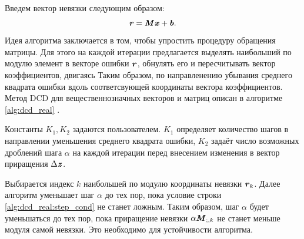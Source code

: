 Введем вектор невязки следующим образом:
\begin{equation}
	\textbf{\textit{r}}=\textbf{\textit{M}}\textbf{\textit{x}}+\textbf{\textit{b}}.
	\label{system_of_lin_eq_residual}
\end{equation}
Идея алгоритма заключается в том, чтобы упростить процедуру обращения матрицы. Для этого на каждой итерации предлагается выделять наибольший по модулю элемент в векторе ошибки $\textbf{\textit{r}}$, обнулять его и пересчитывать вектор коэффициентов, двигаясь Таким образом, по направленению убывания среднего квадрата ошибки вдоль соответсвующей координаты вектора коэффициентов. Метод DCD для вещественнозначных векторов и матриц описан в алгоритме \ref{alg:dcd_real} \cite{dcd_alg_thesis}.
\begin{algorithm}[!ht]
	\caption{Real-valued leading DCD algorithm}
	\label{alg:dcd_real}
\end{algorithm}

Константы $K_1, K_2$ задаются пользователем. $K_1$ определяет количество шагов в направлении уменьшения среднего квадрата ошибки, $K_2$ задаёт число возможных дроблений шага $\alpha$ на каждой итерации перед внесением изменения в вектор приращения $\Delta\textbf{\textit{z}}$. 

Выбирается индекс $k$ наибольшей по модулю координаты невязки $\textbf{\textit{r}}_k$. Далее алгоритм уменьшает шаг $\alpha$ до тех пор, пока условие строки \ref{alg:dcd_real:step_cond} не станет ложным. Таким образом, шаг $\alpha$ будет уменьшаться до тех пор, пока приращение невязки $\alpha\textbf{\textit{M}}_{;,k}$ не станет меньше модуля самой невязки. Это необходимо для устойчивости алгоритма. 


